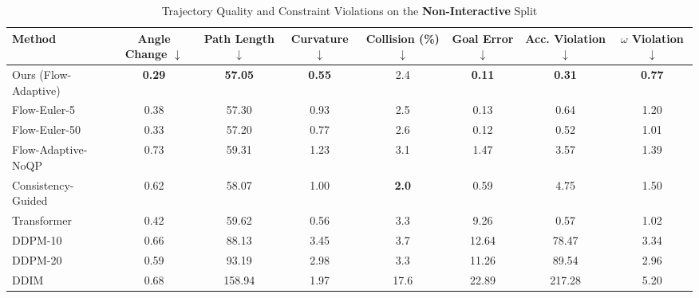 \documentclass[conference]{IEEEtran}
\begin{document}
\begin{table}[t]
\centering
\caption{Trajectory Quality and Constraint Violations on the \textbf{Non-Interactive} Split}
\label{tab:quality_and_constraints_non_int}
\begin{adjustbox}{max width=\textwidth}
\begin{tabular}{lccccccc}
\toprule
\textbf{Method} & \textbf{Angle Change} $\downarrow$ & \textbf{Path Length} $\downarrow$ & \textbf{Curvature} $\downarrow$ & \textbf{Collision (\%)} $\downarrow$ & \textbf{Goal Error} $\downarrow$ & \textbf{Acc. Violation} $\downarrow$ & \textbf{$\omega$ Violation} $\downarrow$ \\
\midrule
Ours (Flow-Adaptive) & \textbf{0.29} & \textbf{57.05} & \textbf{0.55} & 2.4 & \textbf{0.11} & \textbf{0.31} & \textbf{0.77} \\
Flow-Euler-5  & 0.38 & 57.30 & 0.93 & 2.5 & 0.13 & 0.64 & 1.20 \\
Flow-Euler-50 & 0.33 & 57.20 & 0.77 & 2.6 & 0.12 & 0.52 & 1.01 \\
Flow-Adaptive-NoQP & 0.73 & 59.31 & 1.23 & 3.1 & 1.47 & 3.57 & 1.39  \\ 
Consistency-Guided       & 0.62 & 58.07 & 1.00 & \textbf{2.0} & 0.59 & 4.75 & 1.50 \\
Transformer       & 0.42 & 59.62 & 0.56 & 3.3 & 9.26 & 0.57 & 1.02 \\
DDPM-10           & 0.66 & 88.13 & 3.45 & 3.7 & 12.64 & 78.47 & 3.34 \\
DDPM-20           & 0.59 & 93.19 & 2.98 & 3.3 & 11.26 & 89.54 & 2.96 \\
DDIM              & 0.68 & 158.94 & 1.97 & 17.6 & 22.89 & 217.28 & 5.20 \\
\bottomrule
\end{tabular}
\end{adjustbox}
\end{table}
\end{document}

